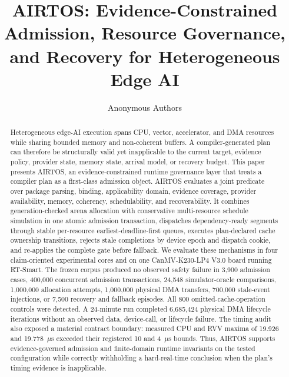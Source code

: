 \documentclass[lettersize,journal]{IEEEtran}
\begin{document}
\title{AIRTOS: Evidence-Constrained Admission, Resource Governance, and Recovery for Heterogeneous Edge AI}

\author{Anonymous Authors}

\maketitle

\begin{abstract}
Heterogeneous edge-AI execution spans CPU, vector, accelerator, and DMA
resources while sharing bounded memory and non-coherent buffers. A
compiler-generated plan can therefore be structurally valid yet inapplicable
to the current target, evidence policy, provider state, memory state, arrival
model, or recovery budget. This paper presents AIRTOS, an
evidence-constrained runtime governance layer that treats a compiler plan as a
first-class admission object. AIRTOS evaluates a joint predicate over package
parsing, binding, applicability domain, evidence coverage, provider
availability, memory, coherency, schedulability, and recoverability. It
combines generation-checked arena allocation with conservative multi-resource
schedule simulation in one atomic admission transaction, dispatches
dependency-ready segments through stable per-resource earliest-deadline-first
queues, executes plan-declared cache ownership transitions, rejects stale
completions by device epoch and dispatch cookie, and re-applies the complete
gate before fallback. We evaluate these mechanisms in four claim-oriented
experimental cores and on one CanMV-K230-LP4 V3.0 board running RT-Smart. The
frozen corpus produced no observed safety failure in 3,900 admission cases,
400,000 concurrent admission transactions, 24,548 simulator-oracle
comparisons, 1,000,000 allocation attempts, 1,000,000 physical DMA transfers,
700,000 stale-event injections, or 7,500 recovery and fallback episodes. All
800 omitted-cache-operation controls were detected. A 24-minute run completed
6,685,424 physical DMA lifecycle iterations without an observed data,
device-call, or lifecycle failure. The timing audit also exposed a material
contract boundary: measured CPU and RVV maxima of 19.926 and 19.778~$\mu$s
exceeded their registered 10 and 4~$\mu$s bounds. Thus, AIRTOS supports
evidence-governed admission and finite-domain runtime invariants on the tested
configuration while correctly withholding a hard-real-time conclusion when
the plan's timing evidence is inapplicable.
\end{abstract}
\end{document}
